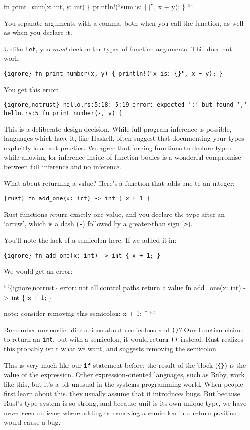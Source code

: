 \documentclass[]{article}
\begin{document}
fn print\_sum(x: int, y: int) \{ println!(``sum is: \{\}'', x + y); \}
```

You separate arguments with a comma, both when you call the function, as
well as when you declare it.

Unlike \texttt{let}, you \emph{must} declare the types of function
arguments. This does not work:

\texttt{\{ignore\} fn print\_number(x, y) \{     println!("x is: \{\}", x + y); \}}

You get this error:

\texttt{\{ignore,notrust\} hello.rs:5:18: 5:19 error: expected `:` but found `,` hello.rs:5 fn print\_number(x, y) \{}

This is a deliberate design decision. While full-program inference is
possible, languages which have it, like Haskell, often suggest that
documenting your types explicitly is a best-practice. We agree that
forcing functions to declare types while allowing for inference inside
of function bodies is a wonderful compromise between full inference and
no inference.

What about returning a value? Here's a function that adds one to an
integer:

\texttt{\{rust\} fn add\_one(x: int) -\textgreater{} int \{     x + 1 \}}

Rust functions return exactly one value, and you declare the type after
an `arrow', which is a dash (\texttt{-}) followed by a greater-than sign
(\texttt{\textgreater{}}).

You'll note the lack of a semicolon here. If we added it in:

\texttt{\{ignore\} fn add\_one(x: int) -\textgreater{} int \{     x + 1; \}}

We would get an error:

```\{ignore,notrust\} error: not all control paths return a value fn
add\_one(x: int) -\textgreater{} int \{ x + 1; \}

note: consider removing this semicolon: x + 1; \^{} ```

Remember our earlier discussions about semicolons and \texttt{()}? Our
function claims to return an \texttt{int}, but with a semicolon, it
would return \texttt{()} instead. Rust realizes this probably isn't what
we want, and suggests removing the semicolon.

This is very much like our \texttt{if} statement before: the result of
the block (\texttt{\{\}}) is the value of the expression. Other
expression-oriented languages, such as Ruby, work like this, but it's a
bit unusual in the systems programming world. When people first learn
about this, they usually assume that it introduces bugs. But because
Rust's type system is so strong, and because unit is its own unique
type, we have never seen an issue where adding or removing a semicolon
in a return position would cause a bug.
\end{document}
